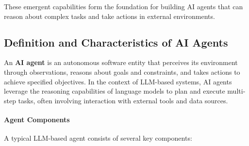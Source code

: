 \documentclass[a4paper,twoside]{sapthesis}
\begin{document}
These emergent capabilities form the foundation for building AI agents that can reason about complex tasks and take actions in external environments.

\subsection{Definition and Characteristics of AI Agents}

An \textbf{AI agent} is an autonomous software entity that perceives its environment through observations, reasons about goals and constraints, and takes actions to achieve specified objectives. In the context of LLM-based systems, AI agents leverage the reasoning capabilities of language models to plan and execute multi-step tasks, often involving interaction with external tools and data sources.

\paragraph{Agent Components}
A typical LLM-based agent consists of several key components:
\end{document}
